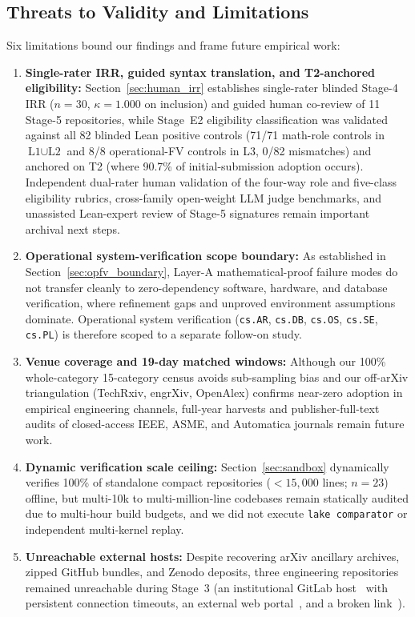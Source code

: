 \documentclass[11pt,letterpaper]{article}
\begin{document}
\subsection{Threats to Validity and Limitations}
Six limitations bound our findings and frame future empirical work:
\begin{enumerate}
  \item \textbf{Single-rater IRR, guided syntax translation, and T2-anchored eligibility:} Section~\ref{sec:human_irr} establishes single-rater blinded Stage-4 IRR ($n = 30$, $\kappa = 1.000$ on inclusion) and guided human co-review of 11 Stage-5 repositories, while Stage~E2 eligibility classification was validated against all 82 blinded Lean positive controls (71/71 math-role controls in $\text{L1} \cup \text{L2}$ and 8/8 operational-FV controls in L3, 0/82 mismatches) and anchored on T2 (where 90.7\% of initial-submission adoption occurs). Independent dual-rater human validation of the four-way role and five-class eligibility rubrics, cross-family open-weight LLM judge benchmarks, and unassisted Lean-expert review of Stage-5 signatures remain important archival next steps.
  \item \textbf{Operational system-verification scope boundary:} As established in Section~\ref{sec:opfv_boundary}, Layer-A mathematical-proof failure modes do not transfer cleanly to zero-dependency software, hardware, and database verification, where refinement gaps and unproved environment assumptions dominate. Operational system verification (\texttt{cs.AR}, \texttt{cs.DB}, \texttt{cs.OS}, \texttt{cs.SE}, \texttt{cs.PL}) is therefore scoped to a separate follow-on study.
  \item \textbf{Venue coverage and 19-day matched windows:} Although our 100\% whole-category 15-category census avoids sub-sampling bias and our off-arXiv triangulation (TechRxiv, engrXiv, OpenAlex) confirms near-zero adoption in empirical engineering channels, full-year harvests and publisher-full-text audits of closed-access IEEE, ASME, and Automatica journals remain future work.
  \item \textbf{Dynamic verification scale ceiling:} Section~\ref{sec:sandbox} dynamically verifies 100\% of standalone compact repositories ($<15{,}000$ lines; $n = 23$) offline, but multi-10k to multi-million-line codebases remain statically audited due to multi-hour build budgets, and we did not execute \texttt{lake comparator} or independent multi-kernel replay.
  \item \textbf{Unreachable external hosts:} Despite recovering arXiv ancillary archives, zipped GitHub bundles, and Zenodo deposits, three engineering repositories remained unreachable during Stage~3 (an institutional GitLab host~\cite{arxiv2611_22732} with persistent connection timeouts, an external web portal~\cite{arxiv2611_09169}, and a broken link~\cite{arxiv2611_04545}).

\end{enumerate}
\end{document}
